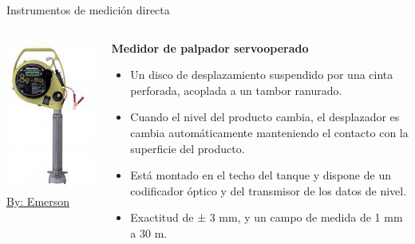 \documentclass[aspectratio=169]{beamer}
\begin{document}
\begin{frame}{Instrumentos de medición directa}
    \begin{columns}[c, onlytextwidth]
        \begin{column}{0.45\textwidth}
        \centering
        \includegraphics[width = 0.6\linewidth]{fig/Nivel/Servooperado.jpg}
            \tiny{\href{https://www.emerson.com}{By: Emerson}}
        \end{column}
        \begin{column}{0.55\textwidth}
        \textbf{Medidor de palpador servooperado}
            \begin{itemize}
                \item Un disco de desplazamiento suspendido por una cinta perforada, acoplada a un tambor ranurado.
                \item Cuando el nivel del producto cambia, el desplazador es cambia automáticamente manteniendo el contacto con la superficie del producto.   
                \item Está montado en el techo del tanque y dispone de un codificador óptico y del transmisor de los datos de nivel.
                \item Exactitud de ± 3 mm, y un campo de medida de 1 mm a 30 m.
            \end{itemize}
            
        \end{column}
    \end{columns}
\end{frame} 
\end{document}
